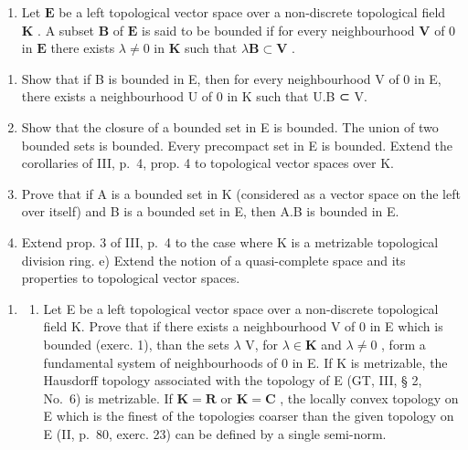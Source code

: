 \exercisegroup

\begin{enumerate}
\def\labelenumi{\arabic{enumi})}
\tightlist
\item
  Let \(\mathbf{E}\) be a left topological vector space over a non-discrete topological field \(\mathbf{K}\) . A subset \(\mathbf{B}\) of \(\mathbf{E}\) is said to be bounded if for every neighbourhood \(\mathbf{V}\) of 0 in \(\mathbf{E}\) there exists \(\lambda \neq 0\) in \(\mathbf{K}\) such that \(\lambda \mathbf{B} \subset \mathbf{V}\) .
\end{enumerate}

\begin{enumerate}
\def\labelenumi{\alph{enumi})}
\item
  Show that if B is bounded in E, then for every neighbourhood V of 0 in E, there exists a neighbourhood U of 0 in K such that U.B ⊂ V.
\item
  Show that the closure of a bounded set in E is bounded. The union of two bounded sets is bounded. Every precompact set in E is bounded. Extend the corollaries of III, p.~4, prop. 4 to topological vector spaces over K.
\item
  Prove that if A is a bounded set in K (considered as a vector space on the left over itself) and B is a bounded set in E, then A.B is bounded in E.
\item
  Extend prop. 3 of III, p.~4 to the case where K is a metrizable topological division ring. e) Extend the notion of a quasi-complete space and its properties to topological vector spaces.
\end{enumerate}

\begin{enumerate}
\def\labelenumi{\arabic{enumi})}
\setcounter{enumi}{1}
\tightlist
\item
  \begin{enumerate}
  \def\labelenumii{\alph{enumii})}
  \tightlist
  \item
    Let E be a left topological vector space over a non-discrete topological field K. Prove that if there exists a neighbourhood V of 0 in E which is bounded (exerc. 1), than the sets \(\lambda\) V, for \(\lambda \in \mathbf{K}\) and \(\lambda \neq 0\) , form a fundamental system of neighbourhoods of 0 in E. If K is metrizable, the Hausdorff topology associated with the topology of E (GT, III, § 2, No.~6) is metrizable. If \(\mathbf{K} = \mathbf{R}\) or \(\mathbf{K} = \mathbf{C}\) , the locally convex topology on E which is the finest of the topologies coarser than the given topology on E (II, p.~80, exerc. 23) can be defined by a single semi-norm.
  \end{enumerate}
\end{enumerate}

